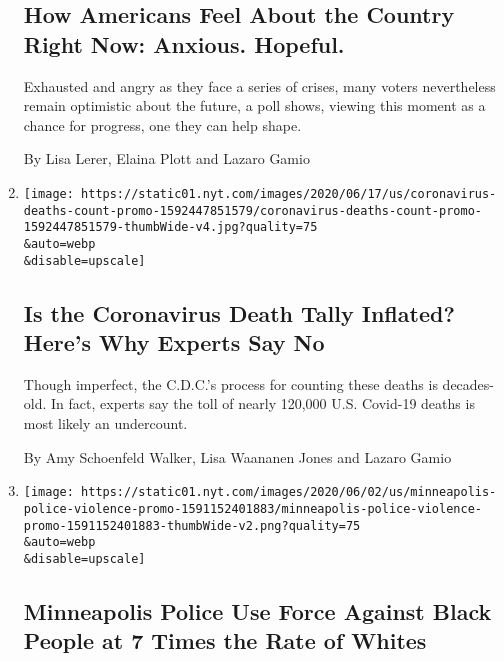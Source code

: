 \begin{enumerate}
{  \subsection{How Americans Feel About the Country Right Now: Anxious.
  Hopeful.}\label{how-americans-feel-about-the-country-right-now-anxious-hopeful}}

  Exhausted and angry as they face a series of crises, many voters
  nevertheless remain optimistic about the future, a poll shows, viewing
  this moment as a chance for progress, one they can help shape.

  By Lisa Lerer, Elaina Plott and Lazaro Gamio
\item
  \href{/interactive/2020/06/19/us/us-coronavirus-covid-death-toll.html}{}

  \texttt{[image: https://static01.nyt.com/images/2020/06/17/us/coronavirus-deaths-count-promo-1592447851579/coronavirus-deaths-count-promo-1592447851579-thumbWide-v4.jpg?quality=75\\\&auto=webp\\\&disable=upscale]}

  \hypertarget{is-the-coronavirus-death-tally-inflated-heres-why-experts-say-no}{%
  \subsection{Is the Coronavirus Death Tally Inflated? Here's Why
  Experts Say
  No}\label{is-the-coronavirus-death-tally-inflated-heres-why-experts-say-no}}

  Though imperfect, the C.D.C.'s process for counting these deaths is
  decades-old. In fact, experts say the toll of nearly 120,000 U.S.
  Covid-19 deaths is most likely an undercount.

  By Amy Schoenfeld Walker, Lisa Waananen Jones and Lazaro Gamio
\item
  \href{/interactive/2020/06/03/us/minneapolis-police-use-of-force.html}{}

  \texttt{[image: https://static01.nyt.com/images/2020/06/02/us/minneapolis-police-violence-promo-1591152401883/minneapolis-police-violence-promo-1591152401883-thumbWide-v2.png?quality=75\\\&auto=webp\\\&disable=upscale]}

  \hypertarget{minneapolis-police-use-force-against-black-people-at-7-times-the-rate-of-whites}{%
  \subsection{Minneapolis Police Use Force Against Black People at 7
  Times the Rate of
  Whites}\label{minneapolis-police-use-force-against-black-people-at-7-times-the-rate-of-whites}}


\end{enumerate}
